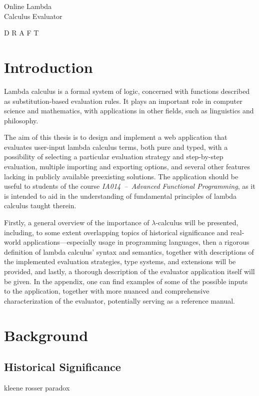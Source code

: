\documentclass[a4paper,10pt]{article}
\begin{document}
\vspace*{7cm}
\begin{center}
{\Huge 
Online Lambda\\Calculus Evaluator
}

D R A F T
\end{center}

\newpage
\tableofcontents
\newpage

\section{Introduction}

Lambda calculus is a formal system of logic, concerned with functions described as
substitution-based evaluation rules. It plays an important role in computer science
and mathematics, with applications in other fields, such as linguistics 
and philosophy.

The aim of this thesis is to design and implement a web application that evaluates
user-input lambda calculus terms, both pure and typed, with a possibility of
selecting a particular evaluation strategy and step-by-step evaluation, 
multiple importing and exporting options, and several other features lacking 
in publicly available preexisting solutions. The application should be useful to students of
the course \textit{IA014~--~Advanced Functional Programming}, as it is intended to aid in the understanding
of fundamental principles of lambda calculus taught therein.

Firstly, a general overview of the importance of $\lambda$-calculus will be presented,
including, to some extent overlapping topics of historical significance 
and real-world applications---especially usage in
programming languages, then a rigorous definition of lambda calculus' syntax and semantics, together with
descriptions of the implemented evaluation strategies, type systems, and extensions will be provided,
and lastly, a thorough description of the evaluator application itself will be given. In the appendix,
one can find examples of some of the possible inputs to the application, together with more
nuanced and comprehensive characterization of the evaluator, potentially serving as a reference manual.
\newpage

\section{Background}
\subsection{Historical Significance}
kleene rosser paradox
\end{document}
